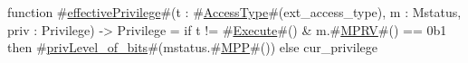 function #\hyperref[sailRISCVzeffectivePrivilege]{effectivePrivilege}#(t : #\hyperref[sailRISCVzAccessType]{AccessType}#(ext_access_type), m : Mstatus, priv : Privilege) -> Privilege =
  if   t != #\hyperref[sailRISCVzExecute]{Execute}#() & m.#\hyperref[sailRISCVzMPRV]{MPRV}#() == 0b1
  then #\hyperref[sailRISCVzprivLevelzyofzybits]{privLevel\_of\_bits}#(mstatus.#\hyperref[sailRISCVzMPP]{MPP}#())
  else cur_privilege
